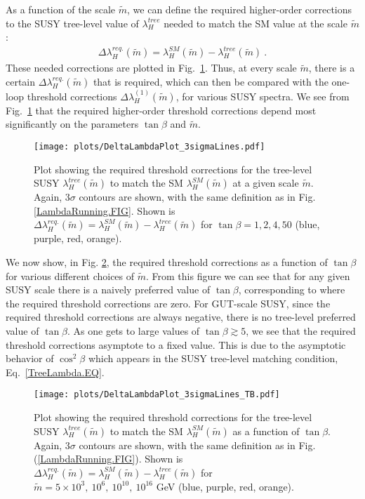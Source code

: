 \documentclass[12pt]{article}
\newcommand{\mS}{\tilde{m}}
\begin{document}
As a function of the scale $\mS$, we can define the required higher-order corrections to the SUSY tree-level value of $\lambda^{tree}_H$ needed to match the SM value at the scale $\mS$:
\begin{align}
\Delta\lambda^{req.}_H (\mS) = \lambda^{SM}_H (\mS) - \lambda^{tree}_H (\mS) \ .
\end{align}
These needed corrections are plotted in Fig.~\ref{DeltaLambdaRunning.FIG}.
Thus, at every scale $\mS$, there is a certain $\Delta\lambda^{req.}_H(\mS)$ that is required, which can then be compared with the one-loop threshold corrections $\Delta\lambda^{(1)}_H(\mS)$, for various SUSY spectra. We see from Fig.~\ref{DeltaLambdaRunning.FIG} that the required higher-order threshold corrections depend most significantly on the parameters $\tan\beta$ and $\mS$.

\begin{figure}[t]
\centering
\texttt{[image: plots/DeltaLambdaPlot\_3sigmaLines.pdf]}
\caption{Plot showing the required threshold corrections for the tree-level SUSY $\lambda^{tree}_H(\mS)$ to match the SM $\lambda^{SM}_H(\mS)$ at a given scale $\mS$. Again, 3$\sigma$ contours are shown, with the same definition as in Fig. \ref{LambdaRunning.FIG}. Shown is $\Delta \lambda^{req.}_H(\mS) = \lambda^{SM}_H(\mS) - \lambda^{tree}_H(\mS)$ for $\tan \beta = 1, 2, 4, 50$ (blue, purple, red, orange).}
\label{DeltaLambdaRunning.FIG}
\end{figure}


 We now show, in Fig. \ref{DeltaLambdaPlotTB.FIG}, the required threshold corrections as a function of $\tan\beta$ for various different choices of $\mS$. From this figure we can see that for any given SUSY scale there is a naively preferred value of $\tan\beta$, corresponding to where the required threshold corrections are zero. For GUT-scale SUSY, since the required threshold corrections are always negative, there is no tree-level preferred value of $\tan\beta$. As one gets to large values of $\tan\beta\gtrsim 5$, we see that the required threshold corrections asymptote to a fixed value. This is due to the asymptotic behavior of $\cos^2\beta$ which appears in the SUSY tree-level matching condition, Eq.~\ref{TreeLambda.EQ}.

\begin{figure}[t]
\centering
\texttt{[image: plots/DeltaLambdaPlot\_3sigmaLines\_TB.pdf]}
\caption{Plot showing the required threshold corrections for the tree-level SUSY $\lambda^{tree}_H(\mS)$ to match the SM $\lambda^{SM}_H(\mS)$ as a function of $\tan \beta$. Again, 3$\sigma$ contours are shown, with the same definition as in Fig. (\ref{LambdaRunning.FIG}). Shown is $\Delta \lambda^{req.}_H(\mS) = \lambda^{SM}_H(\mS) - \lambda^{tree}_H(\mS)$ for $\mS = 5\times10^3,~10^6,~ 10^{10},~10^{16}$ GeV (blue, purple, red, orange).}
\label{DeltaLambdaPlotTB.FIG}
\end{figure}
\end{document}
